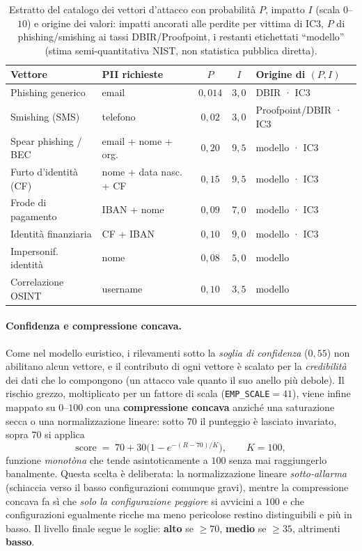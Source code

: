 \documentclass[11pt,a4paper]{article}
\begin{document}
\begin{table}[htbp]
\centering\footnotesize
\renewcommand{\arraystretch}{1.2}
\begin{tabular}{l l c c l}
\toprule
\textbf{Vettore} & \textbf{PII richieste} & $P$ & $I$ & \textbf{Origine di $(P,I)$} \\
\midrule
Phishing generico       & email                    & $0{,}014$ & $3{,}0$ & DBIR · IC3 \\
Smishing (SMS)          & telefono                 & $0{,}02$  & $3{,}0$ & Proofpoint/DBIR · IC3 \\
Spear phishing / BEC    & email + nome + org.      & $0{,}20$  & $9{,}5$ & modello · IC3 \\
Furto d'identità (CF)   & nome + data nasc. + CF   & $0{,}15$  & $9{,}5$ & modello · IC3 \\
Frode di pagamento      & IBAN + nome              & $0{,}09$  & $7{,}0$ & modello · IC3 \\
Identità finanziaria    & CF + IBAN                & $0{,}10$  & $9{,}0$ & modello · IC3 \\
Impersonif. identità    & nome                     & $0{,}08$  & $5{,}0$ & modello \\
Correlazione OSINT      & username                 & $0{,}10$  & $3{,}5$ & modello \\
\bottomrule
\end{tabular}
\caption{Estratto del catalogo dei vettori d'attacco con probabilità $P$, impatto $I$ (scala $0$--$10$) e origine dei valori: impatti ancorati alle perdite per vittima di IC3, $P$ di phishing/smishing ai tassi DBIR/Proofpoint, i restanti etichettati ``modello'' (stima semi-quantitativa NIST, non statistica pubblica diretta).}
\label{tab:attacchi}
\end{table}

\paragraph{Confidenza e compressione concava.} Come nel modello euristico, i rilevamenti
sotto la \emph{soglia di confidenza} ($0{,}55$) non abilitano alcun vettore, e il
contributo di ogni vettore è scalato per la \emph{credibilità} dei dati che lo compongono
(un attacco vale quanto il suo anello più debole). Il rischio grezzo, moltiplicato per un
fattore di scala (\texttt{EMP\_SCALE}$=41$), viene infine mappato su $0$--$100$ con una
\textbf{compressione concava} anziché una saturazione secca o una normalizzazione lineare:
sotto $70$ il punteggio è lasciato invariato, sopra $70$ si applica
\[
  \text{score} \;=\; 70 + 30\Big(1 - e^{-(R-70)/K}\Big), \qquad K = 100,
\]
funzione \emph{monotòna} che tende asintoticamente a $100$ senza mai raggiungerlo
banalmente. Questa scelta è deliberata: la normalizzazione lineare \emph{sotto-allarma}
(schiaccia verso il basso configurazioni comunque gravi), mentre la compressione concava
fa sì che \emph{solo la configurazione peggiore} si avvicini a $100$ e che configurazioni
egualmente ricche ma meno pericolose restino distinguibili e più in basso. Il livello
finale segue le soglie: \textbf{alto} se $\geq 70$, \textbf{medio} se $\geq 35$, altrimenti
\textbf{basso}.
\end{document}
